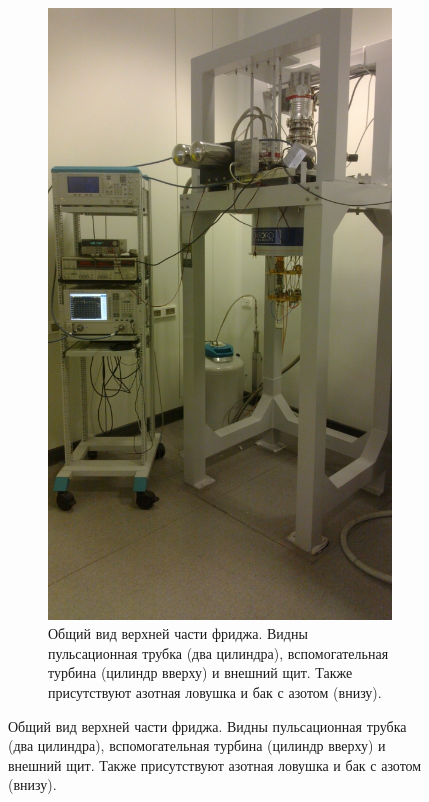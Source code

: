 \documentclass[12pt, twoside]{report}
\numberwithin{equation}{section}
\numberwithin{figure}{section}
\begin{document}
\begin{figure}
\centering
\begingroup

\captionsetup[subfigure]{width = 0.9\textwidth, justification=normal}
\begin{subfigure}[t]{0.45\textwidth}
\centering
\includegraphics[height=0.4\textheight]{Pictures/cryo_general_view}
\caption{Общий вид верхней части фриджа. Видны пульсационная трубка (два цилиндра), вспомогательная турбина (цилиндр вверху) и внешний щит. Также присутствуют азотная ловушка и бак с азотом (внизу).}

\end{subfigure}
\end{figure}
\end{document}
